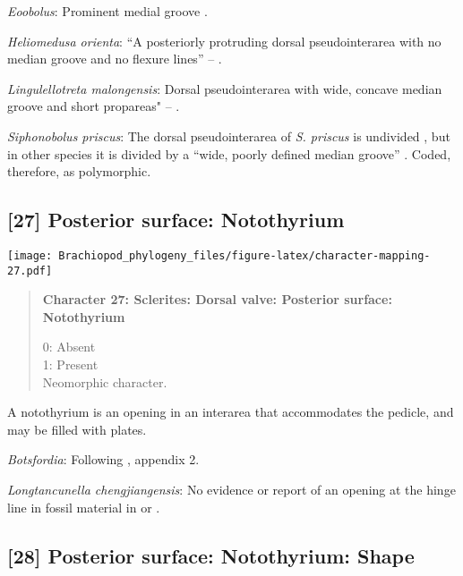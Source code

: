 \documentclass[openany]{book}
\theoremstyle{definition}
\theoremstyle{definition}
\theoremstyle{definition}
\theoremstyle{remark}
\begin{document}
\hypertarget{Eoobolus-coding-26}{}
\emph{Eoobolus}: Prominent medial groove
\citep{Balthasar2009Thebrachiopod}.

\hypertarget{Heliomedusa_orienta-coding-26}{}
\emph{Heliomedusa orienta}: ``A posteriorly protruding dorsal
pseudointerarea with no median groove and no flexure lines'' --
\citet{Chen2007Reinterpretationof}.

\hypertarget{Lingulellotreta_malongensis-coding-26}{}
\emph{Lingulellotreta malongensis}: Dorsal pseudointerarea with wide,
concave median groove and short propareas" --
\citet{Williams2000LinguliformeaCraniiformea}.

\hypertarget{Siphonobolus_priscus-coding-26}{}
\emph{Siphonobolus priscus}: The dorsal pseudointerarea of \emph{S.
priscus} is undivided \citep{Popov2009Earlyontogeny}, but in other
species it is divided by a ``wide, poorly defined median groove''
\citep{Williams2000LinguliformeaCraniiformea}. Coded, therefore, as
polymorphic.

\subsection*{{[}27{]} Posterior surface:
Notothyrium}\label{posterior-surface-notothyrium}

\texttt{[image: Brachiopod\_phylogeny\_files/figure-latex/character-mapping-27.pdf]}

\begin{quote}
\textbf{Character 27: Sclerites: Dorsal valve: Posterior surface:
Notothyrium}

0: Absent\\
1: Present\\
Neomorphic character.
\end{quote}

A notothyrium is an opening in an interarea that accommodates the
pedicle, and may be filled with plates.

\hypertarget{Botsfordia-coding-27}{}
\emph{Botsfordia}: Following \citet{Williams1998Thediversity}, appendix
2.

\hypertarget{Longtancunella_chengjiangensis-coding-27}{}
\emph{Longtancunella chengjiangensis}: No evidence or report of an
opening at the hinge line in fossil material in
\citet{Zhang2007Agregarious} or \citet{Zhang2011Theexceptionally}.

\subsection*{{[}28{]} Posterior surface: Notothyrium:
Shape}\label{posterior-surface-notothyrium-shape}
\end{document}
